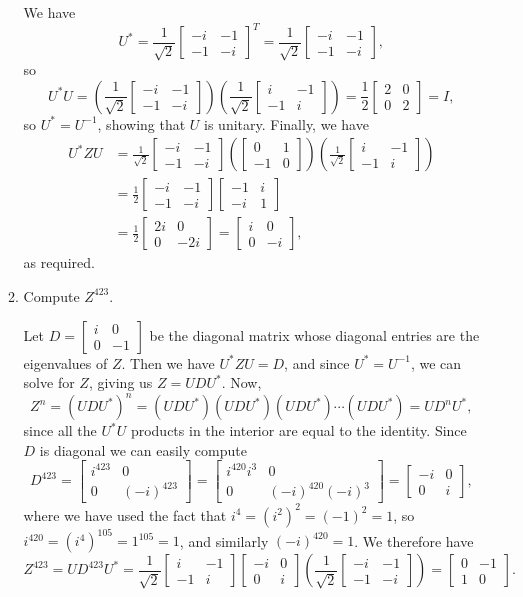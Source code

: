 \documentclass[12pt]{article}
\newcommand{\bbm}{\begin{bmatrix}}
\newcommand{\ebm}{\end{bmatrix}}
\begin{document}
\begin{enumerate}
\begin{enumerate}
We have
\[
 U^* = \dfrac{1}{\sqrt{2}}\bbm -i&-1\\-1&-i\ebm^T = \dfrac{1}{\sqrt{2}}\bbm -i&-1\\-1&-i\ebm,
\]
so
\[
 U^*U = \left(\dfrac{1}{\sqrt{2}}\bbm -i&-1\\-1&-i\ebm\right)\left(\dfrac{1}{\sqrt{2}}\bbm i&-1\\-1&i\ebm\right) = \frac{1}{2}\bbm 2&0\\0&2\ebm = I,
\]
so $U^*=U^{-1}$, showing that $U$ is unitary. Finally, we have
\begin{align*}
 U^*ZU &= \frac{1}{\sqrt{2}}\bbm -i&-1\\-1&-i\ebm\left(\bbm 0&1\\-1&0\ebm\right)\left(\frac{1}{\sqrt{2}}\bbm i&-1\\-1&i\ebm \right)\\
& = \frac{1}{2}\bbm -i&-1\\-1&-i\ebm\bbm -1&i\\-i&1\ebm\\
& = \frac{1}{2}\bbm 2i&0\\0&-2i\ebm = \bbm i&0\\0&-i\ebm,
\end{align*}
as required.
\item Compute $Z^{423}$.

\bigskip

Let $D = \bbm i&0\\0&-1\ebm$ be the diagonal matrix whose diagonal entries are the eigenvalues of $Z$. Then we have $U^*ZU=D$, and since $U^*=U^{-1}$, we can solve for $Z$, giving us $Z = UDU^*$. Now,
\[
 Z^{n} = (UDU^*)^n = (UDU^*)(UDU^*)(UDU^*)\cdots(UDU^*) = UD^nU^*,
\]
since all the $U^*U$ products in the interior are equal to the identity. Since $D$ is diagonal we can easily compute
\[
 D^{423} = \bbm i^{423}&0\\0&(-i)^{423}\ebm = \bbm i^{420}i^3&0\\0&(-i)^{420}(-i)^3\ebm = \bbm -i&0\\0&i\ebm,
\]
where we have used the fact that $i^4 = (i^2)^2 = (-1)^2=1$, so $i^{420} = (i^4)^{105} = 1^105 = 1$, and similarly $(-i)^{420}=1$. We therefore have
\[
 Z^{423} = UD^{423}U^* = \frac{1}{\sqrt{2}}\bbm i&-1\\-1&i\ebm\bbm -i&0\\0&i\ebm \left(\frac{1}{\sqrt{2}}\bbm -i&-1\\-1&-i\ebm \right)= \bbm 0&-1\\1&0\ebm.
\]

\end{enumerate}
 \end{enumerate}
\end{document}
